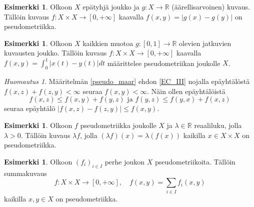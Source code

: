 \documentclass[12pt,a4paper,leqno]{report}
\newcommand{\R}{\mathbb{R}}
\theoremstyle{plain}
\theoremstyle{definition}
\newtheorem{esim}[equation]{Esimerkki}
\theoremstyle{remark}
\newtheorem{huom}[equation]{Huomautus}
\begin{document}
\begin{esim}%
Olkoon $X$ epätyhjä joukko ja $g\colon X\rightarrow \R$ (äärellisarvoinen) kuvaus. Tällöin kuvaus $f\colon X\times X\rightarrow[0,+\infty]$ kaavalla $f(x,y)=|g(x)-g(y)|$ on pseudometriikka.
\end{esim}
\begin{esim}%
Olkoon $X$ kaikkien muotoa $g\colon [0,1]\rightarrow \R$ olevien jatkuvien kuvausten joukko. %
Tällöin kuvaus $f\colon X\times X\rightarrow [0,+\infty]$ kaavalla $f(x,y)=\int_0^1 |x(t)-y(t)|dt$ määrittelee pseudometriikan joukolle $X$.
\end{esim}
\begin{huom}
Määritelmän \ref{pseudo_maar} ehdon \ref{EC_III} nojalla epäyhtälöstä $f(x,z)+f(z,y)<\infty$ seuraa $f(x,y)<\infty$. 
Näin ollen epäyhtälöistä 
\begin{equation*}
f(x,z)\leq f(x,y)+f(y,z)\text{ ja }f(y,z)\leq f(y,x)+f(x,z)
\end{equation*}
seuraa epäyhtälö $|f(x,z)-f(z,y)|\leq f(x,y)$.
\end{huom}
\begin{esim}%
Olkoon $f$ pseudometriikka joukolle $X$ ja 
$\lambda\in\R$ reaaliluku, jolla $\lambda >0$. 
Tällöin kuvaus $\lambda f$, jolla 
$(\lambda f) (x)=\lambda (f (x))$ 
kaikilla $x\in X\times X$ on pseudometriikka.
\end{esim}
\begin{esim}%
Olkoon $(f_i)_{i\in I}$ perhe joukon $X$ pseudometriikoita. 
Tällöin summakuvaus 
\begin{equation*}
f\colon X\times X\rightarrow [0,+\infty],\quad
f(x,y)=\sum_{i\in I}f_i(x,y)%
\end{equation*} 
kaikilla $x,y\in X$ 
on pseudometriikka.
\end{esim}
\end{document}
